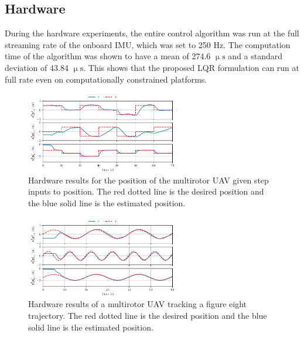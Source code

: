 
\subsection{Hardware}

During the hardware experiments, the entire control algorithm was run at the
full streaming rate of the onboard IMU, which was set to 250 Hz. The computation
time of the algorithm was shown to have a mean of 274.6 $\upmu \mathrm{s}$ and a standard
deviation of 43.84 $\upmu \mathrm{s}$. This shows that the proposed LQR
formulation can run at full rate even on computationally constrained platforms.

\begin{figure}
  \centering
  \includegraphics[width=0.6\textwidth]{figures/mocap_wps_position}
  \caption[LQR Hardware Results Flying Waypoints]{Hardware results for the position of the multirotor UAV given step
  inputs to position. The red dotted line is the desired position and the blue
solid line is the estimated position.}
  \label{f:hardware_wps}
\end{figure}

\begin{figure}
  \centering
  \includegraphics[width=0.6\textwidth]{figures/mocap_fig8_position}
  \caption[LQR Hardware Results Flying a Trajectory]{Hardware results of a multirotor UAV tracking a figure eight
  trajectory. The red dotted line is the desired position and the blue solid
line is the estimated position.}
  \label{f:hardware_fig8}
\end{figure}

